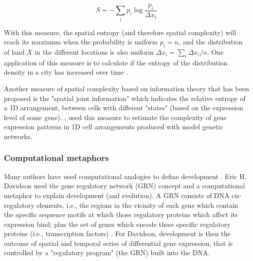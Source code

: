 $$S = - \sum_{i}^{} p_{i} \log \frac{ p_{i} }{ \Delta x_{i} } $$

With this measure, the spatial entropy (and therefore spatial complexity) will reach its maximum when the probability is uniform $p_{i} = n$, and the distribution of land $X$ in the different locations is also uniform $\Delta x_{i} = \sum_{i}^{} \Delta x_{i} / n$. One application of this measure is to calculate if the entropy of the distribution density in a city has increased over time \citep{Batty2010}.

Another measure of spatial complexity based on information theory that has been proposed is the "spatial joint information" \citep{Salazar-Ciudad2001a} which indicates the relative entropy of a 1D arrangement, between cells with different "states" (based on the expression level of some gene). \citet{Salazar-Ciudad2001a}, used this measure to estimate the complexity of gene expression patterns in 1D cell arrangements produced with model genetic networks.

\subsubsection{Computational metaphors}
Many authors have used computational analogies to define development \citep{Apter1965,monod2012cytodifferentiation,mayr1997evolution,Davidson2001}. Eric H. Davidson used the gene regulatory network (GRN) concept and a computational metaphor to explain development (and evolution). A GRN consists of DNA cis-regulatory elements, i.e., the regions in the vicinity of each gene which contain the specific sequence motifs at which those regulatory proteins which affect its expression bind; plus the set of genes which encode these specific regulatory proteins (i.e., transcription factors) \citep{Davidson2001}. For Davidson, development is then the outcome of spatial and temporal series of differential gene expression, that is controlled by a "regulatory program" (the GRN) built into the DNA.

